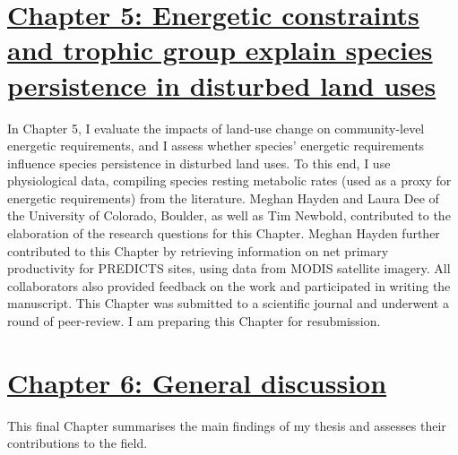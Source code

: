 \section*{\hyperref[sec:5]{Chapter 5: Energetic constraints and trophic group explain species persistence in disturbed land uses}}
In Chapter 5, I evaluate the impacts of land-use change on community-level energetic requirements, and I assess whether species' energetic requirements influence species persistence in disturbed land uses. To this end, I use physiological data, compiling species resting metabolic rates (used as a proxy for energetic requirements) from the literature. Meghan Hayden and Laura Dee of the University of Colorado, Boulder, as well as Tim Newbold, contributed to the elaboration of the research questions for this Chapter. Meghan Hayden further contributed to this Chapter by retrieving information on net primary productivity for PREDICTS sites, using data from MODIS satellite imagery. All collaborators also provided feedback on the work and participated in writing the manuscript. This Chapter was submitted to a scientific journal and underwent a round of peer-review. I am preparing this Chapter for resubmission.

\section*{\hyperref[sec:6]{Chapter 6: General discussion}}
This final Chapter summarises the main findings of my thesis and assesses their contributions to the field.